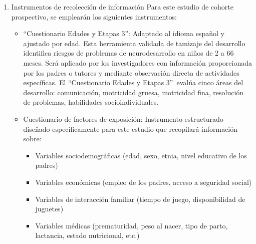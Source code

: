 \documentclass[11pt,letterpaper]{report}
\newcommand{\asq}{“Cuestionario Edades y Etapas 3”}
\begin{document}
\begin{enumerate}
\begin{enumerate}
\begin{itemize}
			sugiriendo la necesidad de intervención especializada.
			\end{itemize}
		Se analizarán las asociaciones entre los factores de exposición
		identificados y los resultados de neurodesarrollo en la evaluación.
	\end{enumerate}
	\item Instrumentos de recolección de información
	Para este estudio de cohorte prospectivo, se emplearán los siguientes
	instrumentos:
		\begin{itemize}
		\item \asq: Adaptado al idioma español y ajustado por edad. Esta
		herramienta validada de tamizaje del desarrollo identifica riesgos de
		problemas de neurodesarrollo en niños de 2 a 66 meses. Será aplicado
		por los investigadores con información proporcionada por los padres o
		tutores y mediante observación directa de actividades específicas.
		El \asq\ evalúa cinco áreas del desarrollo: comunicación, motricidad
		gruesa, motricidad fina, resolución de problemas, habilidades
		socioindividuales.

		\item Cuestionario de factores de exposición: Instrumento estructurado
		diseñado específicamente para este estudio que recopilará información
		sobre:
				\begin{itemize}
					\item Variables sociodemográficas (edad, sexo, etnia, nivel
					educativo de los padres)
					\item Variables económicas (empleo de los padres, acceso a
					seguridad social)
					\item Variables de interacción familiar (tiempo de juego,
					disponibilidad de juguetes)
					\item Variables médicas (prematuridad, peso al nacer, tipo
					de parto, lactancia, estado nutricional, etc.)
				\end{itemize}
		\end{itemize}
\end{enumerate}
\end{document}

